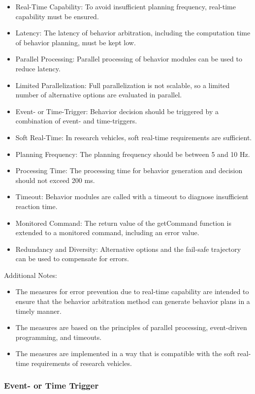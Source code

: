 \begin{itemize}
    \item Real-Time Capability: To avoid insufficient planning frequency, real-time capability must be ensured.
    \item Latency: The latency of behavior arbitration, including the computation time of behavior planning, must be kept low.
    \item Parallel Processing: Parallel processing of behavior modules can be used to reduce latency.
    \item Limited Parallelization: Full parallelization is not scalable, so a limited number of alternative options are evaluated in parallel.
    \item Event- or Time-Trigger: Behavior decision should be triggered by a combination of event- and time-triggers.
    \item Soft Real-Time: In research vehicles, soft real-time requirements are sufficient.
    \item Planning Frequency: The planning frequency should be between 5 and 10 Hz.
    \item Processing Time: The processing time for behavior generation and decision should not exceed 200 ms.
    \item Timeout: Behavior modules are called with a timeout to diagnose insufficient reaction time.
    \item Monitored Command: The return value of the getCommand function is extended to a monitored command, including an error value.
    \item Redundancy and Diversity: Alternative options and the fail-safe trajectory can be used to compensate for errors.
\end{itemize}

Additional Notes:

\begin{itemize}
    \item The measures for error prevention due to real-time capability are intended to ensure that the behavior arbitration method can generate behavior plans in a timely manner.
    \item The measures are based on the principles of parallel processing, event-driven programming, and timeouts.
    \item The measures are implemented in a way that is compatible with the soft real-time requirements of research vehicles.
\end{itemize}

\subsubsection*{Event- or Time Trigger}

